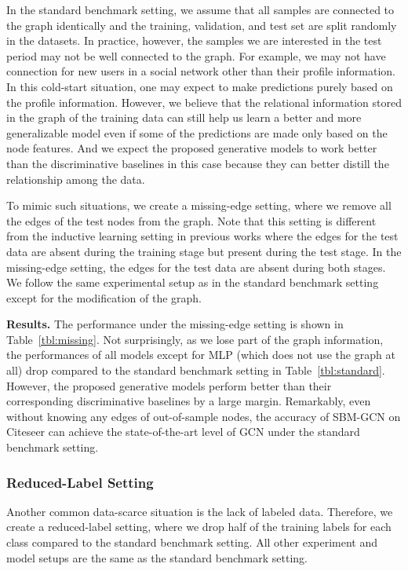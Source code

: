 \documentclass{article}
\newcommand{\vpara}[1]{\vspace{0.05in}\noindent\textbf{#1 }}
\begin{document}
In the standard benchmark setting, we assume that all samples are connected to the graph identically and the training, validation, and test set are split randomly in the datasets. In practice, however, the samples we are interested in the test period may not be well connected to the graph. For example, we may not have connection for new users in a social network other than their profile information. In this cold-start situation, one may expect to make predictions purely based on the profile information. However, we believe that the relational information stored in the graph of the training data can still help us learn a better and more generalizable model even if some of the predictions are made only based on the node features. And we expect the proposed generative models to work better than the discriminative baselines in this case because they can better distill the relationship among the data. 

To mimic such situations, we create a missing-edge setting, where we remove all the edges of the test nodes from the graph. Note that this setting is different from the inductive learning setting in previous works \cite{hamilton2017inductive,velivckovic2017graph} where the edges for the test data are absent during the training stage but present during the test stage. In the missing-edge setting, the edges for the test data are absent during both stages. We follow the same experimental setup as in the standard benchmark setting except for the modification of the graph. 



\vpara{Results.}
The performance under the missing-edge setting is shown in Table~\ref{tbl:missing}. Not surprisingly, as we lose part of the graph information, the performances of all models except for MLP (which does not use the graph at all) drop compared to the standard benchmark setting in Table~\ref{tbl:standard}. However, the proposed generative models perform better than their corresponding discriminative baselines by a large margin. Remarkably, even without knowing any edges of out-of-sample nodes, the accuracy of SBM-GCN on Citeseer can achieve the state-of-the-art level of GCN under the standard benchmark setting.

\subsubsection{Reduced-Label Setting}
Another common data-scarce situation is the lack of labeled data. Therefore, we create a reduced-label setting, where we drop half of the training labels for each class compared to the standard benchmark setting. All other experiment and model setups are the same as the standard benchmark setting.
\end{document}
